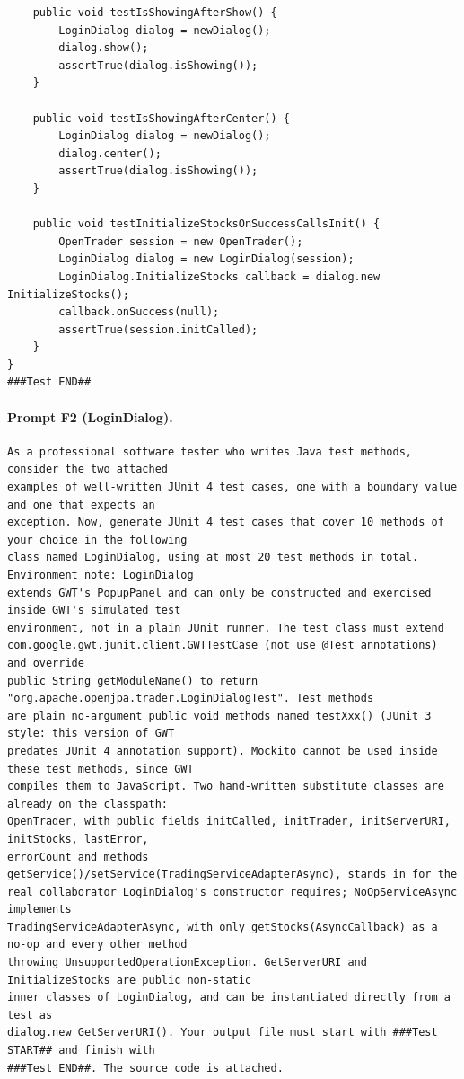 \begin{lstlisting}
    public void testIsShowingAfterShow() {
        LoginDialog dialog = newDialog();
        dialog.show();
        assertTrue(dialog.isShowing());
    }

    public void testIsShowingAfterCenter() {
        LoginDialog dialog = newDialog();
        dialog.center();
        assertTrue(dialog.isShowing());
    }

    public void testInitializeStocksOnSuccessCallsInit() {
        OpenTrader session = new OpenTrader();
        LoginDialog dialog = new LoginDialog(session);
        LoginDialog.InitializeStocks callback = dialog.new InitializeStocks();
        callback.onSuccess(null);
        assertTrue(session.initCalled);
    }
}
###Test END##
\end{lstlisting}

\paragraph*{Prompt F2 (LoginDialog).}
\label{prompt:ld-f2}
\begin{lstlisting}
As a professional software tester who writes Java test methods, consider the two attached
examples of well-written JUnit 4 test cases, one with a boundary value and one that expects an
exception. Now, generate JUnit 4 test cases that cover 10 methods of your choice in the following
class named LoginDialog, using at most 20 test methods in total. Environment note: LoginDialog
extends GWT's PopupPanel and can only be constructed and exercised inside GWT's simulated test
environment, not in a plain JUnit runner. The test class must extend
com.google.gwt.junit.client.GWTTestCase (not use @Test annotations) and override
public String getModuleName() to return "org.apache.openjpa.trader.LoginDialogTest". Test methods
are plain no-argument public void methods named testXxx() (JUnit 3 style: this version of GWT
predates JUnit 4 annotation support). Mockito cannot be used inside these test methods, since GWT
compiles them to JavaScript. Two hand-written substitute classes are already on the classpath:
OpenTrader, with public fields initCalled, initTrader, initServerURI, initStocks, lastError,
errorCount and methods getService()/setService(TradingServiceAdapterAsync), stands in for the
real collaborator LoginDialog's constructor requires; NoOpServiceAsync implements
TradingServiceAdapterAsync, with only getStocks(AsyncCallback) as a no-op and every other method
throwing UnsupportedOperationException. GetServerURI and InitializeStocks are public non-static
inner classes of LoginDialog, and can be instantiated directly from a test as
dialog.new GetServerURI(). Your output file must start with ###Test START## and finish with
###Test END##. The source code is attached.
\end{lstlisting}

